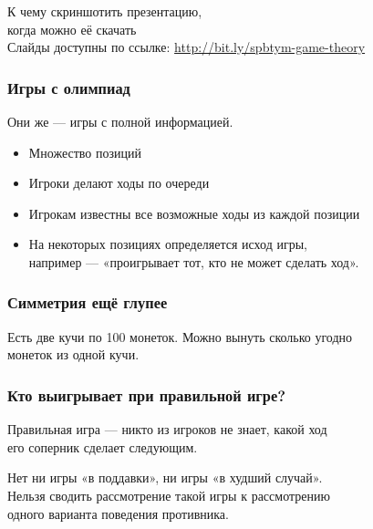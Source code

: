 \begin{frame} \begin{center}
	{\Large К чему скриншотить презентацию,\smallskip\\
		когда можно её скачать} \\ [0.9cm]
	{\small Слайды доступны по ссылке: \url{http://bit.ly/spbtym-game-theory}}
\end{center} \end{frame}

\begin{frame} \frametitle{Игры с олимпиад}
	Они же — игры с полной информацией.

\begin{itemize} \itemsep=2.25mm
	\item Множество позиций
	\item Игроки делают ходы по очереди
	\item Игрокам известны все возможные ходы из каждой позиции
	\item На некоторых позициях определяется исход игры, \\
		например — «проигрывает тот, кто не может сделать ход».
\end{itemize}
\end{frame}

\begin{frame} \frametitle{Симметрия ещё глупее}
	Есть две кучи по 100 монеток. Можно вынуть сколько угодно \\
	монеток из одной кучи.
	\medskip \pause

\begin{center}  \end{center}
\end{frame}

\begin{frame} \frametitle{Кто выигрывает при правильной игре?}
	Правильная игра — никто из игроков не знает, какой ход \\
	его соперник сделает следующим. \bigskip
	
	Нет ни игры «в поддавки», ни игры «в худший случай». \\
	Нельзя сводить рассмотрение такой игры к рассмотрению \\
	одного варианта поведения противника.
\end{frame}

